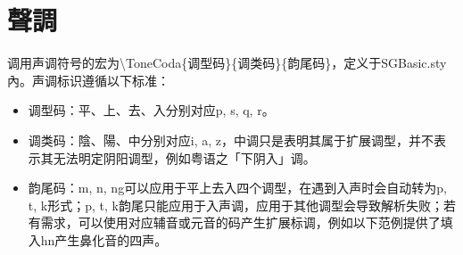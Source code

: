 \section{聲調}
调用声调符号的宏为{\textbackslash}ToneCoda\{调型码\}\{调类码\}\{韵尾码\}，定义于SGBasic.sty內。声调标识遵循以下标准：\par
\begin{itemize}
	\item 调型码：平、上、去、入分别对应p, s, q, r。
	\item 调类码：陰、陽、中分别对应i, a, z，中调只是表明其属于扩展调型，并不表示其无法明定阴阳调型，例如粤语之「下阴入」调。
	\item 韵尾码：m, n, ng可以应用于平上去入四个调型，在遇到入声时会自动转为p, t, k形式；p, t, k韵尾只能应用于入声调，应用于其他调型会导致解析失败；若有需求，可以使用对应辅音或元音的码产生扩展标调，例如以下范例提供了填入hn产生鼻化音的四声。
\end{itemize}
\clearpage